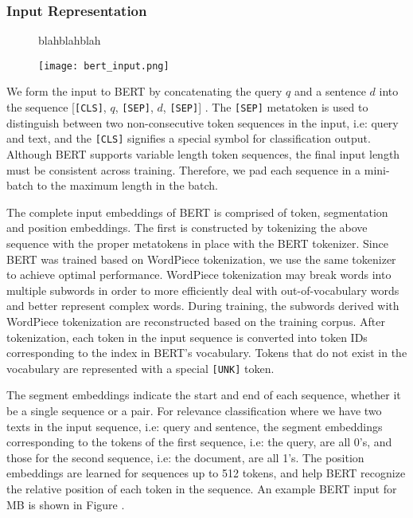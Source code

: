 \subsubsection{Input Representation}

\begin{figure}[t!]
	\begin{framed}
		\centering
		blahblahblah
	\end{framed}
\label{bert-tokenization-example}
 \caption{}
\end{figure}

\begin{figure}[b!]
\centering
  \texttt{[image: bert\_input.png]}
\caption{}
\label{fig:bert_input}
\end{figure}

We form the input to BERT by concatenating the query $ q $ and a sentence $ d $ into the sequence [\texttt{[CLS]}, $q$, \texttt{[SEP]}, $d$, \texttt{[SEP]}] .
The \texttt{[SEP]} metatoken is used to distinguish between two non-consecutive token sequences in the input, i.e: query and text, and the \texttt{[CLS]} signifies a special symbol for classification output.
Although BERT supports variable length token sequences, the final input length must be consistent across training.
Therefore, we pad each sequence in a mini-batch to the maximum length in the batch.

The complete input embeddings of BERT is comprised of token, segmentation and position embeddings.
The first is constructed by tokenizing the above sequence with the proper metatokens in place with the BERT tokenizer.
Since BERT was trained based on WordPiece tokenization, we use the same tokenizer to achieve optimal performance.
WordPiece tokenization may break words into multiple subwords in order to more efficiently deal with out-of-vocabulary words and better represent complex words.
During training, the subwords derived with WordPiece tokenization are reconstructed based on the training corpus.
After tokenization, each token in the input sequence is converted into token IDs corresponding to the index in BERT's vocabulary.
Tokens that do not exist in the vocabulary are represented with a special \texttt{[UNK]} token.

The segment embeddings indicate the start and end of each sequence, whether it be a single sequence or a pair.
For relevance classification where we have two texts in the input sequence, i.e: query and sentence, the segment embeddings corresponding to the tokens of the first sequence, i.e: the query, are all 0's, and those for the second sequence, i.e: the document, are all 1's.
The position embeddings are learned for sequences up to 512 tokens, and help BERT recognize the relative position of each token in the sequence.
An example BERT input for MB is shown in Figure .

